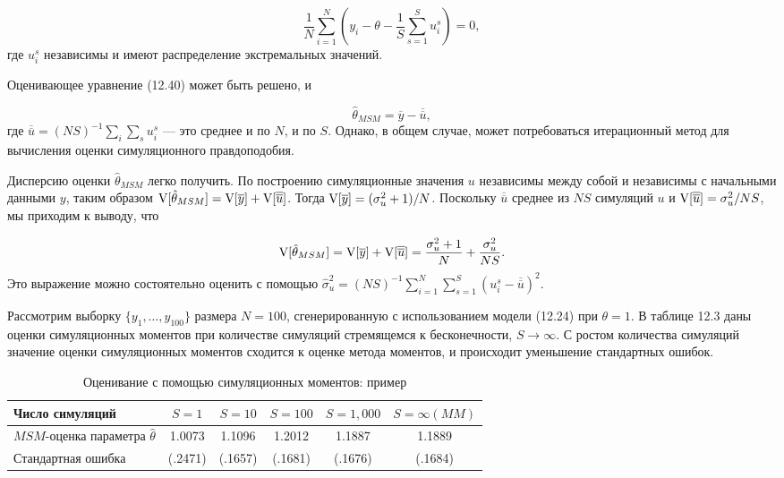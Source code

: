 \begin{equation}
\dfrac{1}{N}\sum^{N}_{i=1}\left(y_i-\theta-\dfrac{1}{S}\sum^{S}_{s=1}u^{s}_i \right)=0, 
\end{equation}
где $u^{s}_i$ независимы и имеют распределение экстремальных значений.

Оценивающее уравнение (12.40) может быть решено, и

\begin{equation}
\hat{\theta}_{MSM}=\overline{y}-\overline{\overline{u}},
\end{equation} 
где $\overline{\overline{u}}=(NS)^{-1}\sum_{i}\sum_{s}u^{s}_i$ --- это среднее и по $N$, и по $S$. Однако, в общем случае, может потребоваться итерационный метод для вычисления оценки симуляционного правдоподобия.

Дисперсию  оценки $\hat{\theta}_{MSM}$ легко получить. По построению симуляционные значения $u$ независимы между собой и независимы с начальными данными $y$, таким образом $\mathrm{V}[\hat{\theta}_{MSM}]=\mathrm{V}[\overline{y}]+\mathrm{V}[\overline{\overline{u}}]$. Тогда $\mathrm{V}[\overline{y}]=(\sigma^{2}_u+1)/N$. Поскольку $\overline{\overline{u}}$ среднее из $NS$ симуляций
$u$ и $\mathrm{V}[\overline{\overline{u}}]=\sigma^{2}_{u}/NS$, мы приходим к выводу, что

\begin{equation}
\mathrm{V}[\hat{\theta}_{MSM}]=\mathrm{V}[\overline{y}]+\mathrm{V}[\overline{\overline{u}}] = \dfrac{\sigma^{2}_u+1}{N}+\dfrac{\sigma^{2}_u}{NS}.
\end{equation}
Это выражение можно состоятельно оценить с помощью $\hat{\sigma}^{2}_u=(NS)^{-1}\sum^{N}_{i=1}\sum^{S}_{s=1}(u^{s}_i-\overline{\overline{u}})^2$.

Рассмотрим выборку $\lbrace{y_1,\ldots ,y_{100}}\rbrace$ размера $N=100$, сгенерированную с использованием модели (12.24) при $\theta=1$. В таблице 12.3 даны оценки симуляционных моментов при количестве симуляций стремящемся к бесконечности, $S \rightarrow \infty$. С ростом количества симуляций значение оценки симуляционных моментов сходится к оценке метода моментов, и происходит уменьшение стандартных ошибок.

\begin{table}[h]
\begin{center}
\caption{\label{tab:pred} Оценивание с помощью симуляционных моментов: пример}
\begin{tabular}{lccccc}
\hline 
\hline
{\bf{Число симуляций}} & $S = 1$ & $S = 10$ & $S = 100$ & $S = 1,000$ & $S = \infty (MM)$ \\ 
\hline
$MSM$-оценка параметра $\hat{\theta}$ & 1.0073 & 1.1096 & 1.2012 & 1.1887 & 1.1889 \\ 
Стандартная ошибка & (.2471) & (.1657) & (.1681) & (.1676) & (.1684) \\ 
\hline 
\hline
\end{tabular} 
\end{center}
\end{table}


